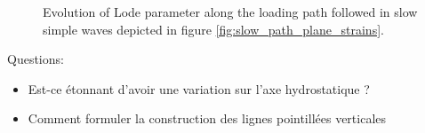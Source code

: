 \begin{figure}[h!]
  \centering
  { \label{subfig:pureShear1}}
  { \label{subfig:pureShear2}}
  
  \caption{Evolution of Lode parameter along the loading path followed in slow simple waves depicted in figure \ref{fig:slow_path_plane_strains}.}
  \label{fig:pureShear}
\end{figure}

Questions:
\begin{itemize}
\item Est-ce étonnant d'avoir une variation sur l'axe hydrostatique ?
\item Comment formuler la construction des lignes pointillées verticales
\end{itemize}
%   


%   


